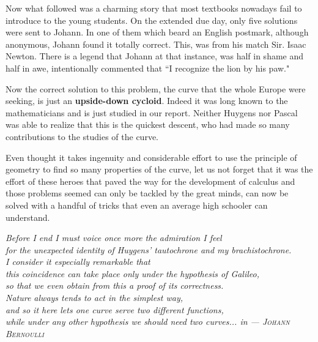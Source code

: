    Now what followed was a charming story that most textbooks nowadays fail
   to introduce to the young students. On the extended due day, only five solutions were sent to Johann. In one of them which beard an English
   postmark, although anonymous, Johann found it totally correct.
   This, was from his match Sir. Isaac Newton. There is a legend that
   Johann at that instance, was half in shame and half in awe, intentionally
   commented that ``I recognize the lion by his paw."
  
  Now the correct solution to this problem, the curve that the whole Europe were seeking, is just an {\bf upside-down cycloid}. Indeed it was long known 
  to the mathematicians and is just studied in our report. Neither Huygens
  nor Pascal was able to realize that this is the quickest descent, who had made so many contributions to the studies of the curve.
  
  Even thought it takes ingenuity and considerable effort to use the principle
  of geometry to find so many properties of the curve, let us not forget that 
  it was the effort of these heroes that paved the way for the development of
  calculus and those problems seemed can only be tackled by the great
  minds, can now be solved with a handful of tricks that even an average high schooler can understand.
  \vfill
{\flushright
	{\sffamily\slshape
		  Before I end I must voice
	once more  the admiration I feel \\
		  for the unexpected identity of Huygens' tautochrone and my brachistochrone. \\
		  I consider it especially remarkable that\\
		   this coincidence can take place only under the hypothesis of Galileo,\\
		   so that we even obtain from this a proof of its correctness.\\ Nature always tends to act in the simplest way, \\
		   and so it here lets one curve serve two different functions,\\
		   while under any other hypothesis we should need two curves...
		  in
		{\hfill\sffamily\upshape --- 
\textsc{Johann Bernoulli}}
	}	

}
